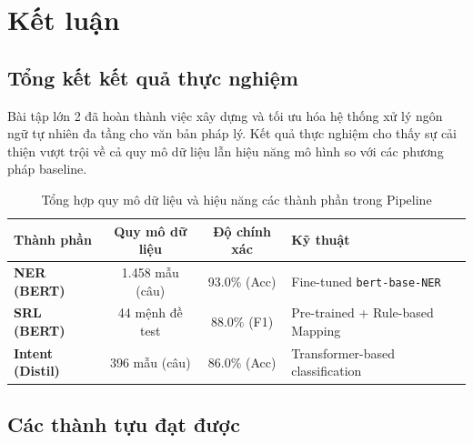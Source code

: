 \section{Kết luận}

\subsection{Tổng kết kết quả thực nghiệm}

Bài tập lớn 2 đã hoàn thành việc xây dựng và tối ưu hóa hệ thống xử lý ngôn ngữ tự nhiên đa tầng cho văn bản pháp lý. Kết quả thực nghiệm cho thấy sự cải thiện vượt trội về cả quy mô dữ liệu lẫn hiệu năng mô hình so với các phương pháp baseline.

\begin{table}[H]
    \centering
    \caption{Tổng hợp quy mô dữ liệu và hiệu năng các thành phần trong Pipeline}
    \label{tab:pipeline_final_stats}
    \begin{tabularx}{\textwidth}{|l|c|c|X|}
        \hline
        \textbf{Thành phần} & \textbf{Quy mô dữ liệu} & \textbf{Độ chính xác} & \textbf{Kỹ thuật} \\ \hline
        \textbf{NER (BERT)} & 1.458 mẫu (câu) & 93.0\% (Acc) & Fine-tuned \texttt{bert-base-NER} \\ \hline
        \textbf{SRL (BERT)} & 44 mệnh đề test & 88.0\% (F1) & Pre-trained + Rule-based Mapping \\ \hline
        \textbf{Intent (Distil)} & 396 mẫu (câu) & 86.0\% (Acc) & Transformer-based classification \\ \hline
    \end{tabularx}
\end{table}

\subsection{Các thành tựu đạt được}

